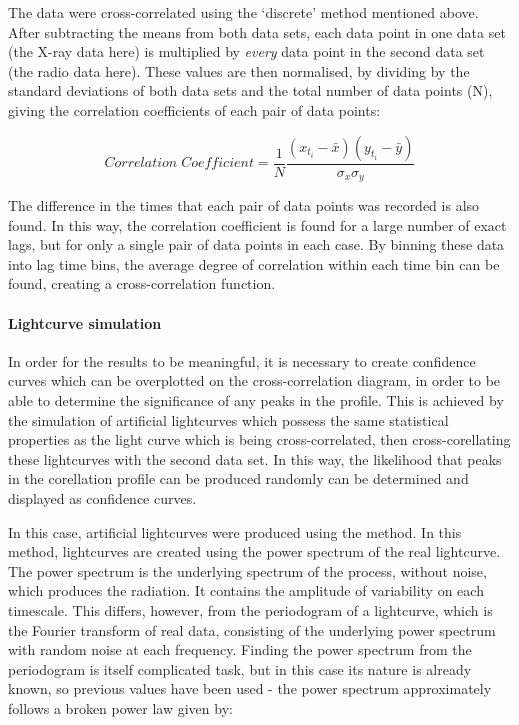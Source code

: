 \documentclass[letters,useAMS,usenatbib]{samnote}
\begin{document}
The data were cross-correlated using the `discrete' method mentioned above. After subtracting the means from both data sets, each data point in one data set (the X-ray
data here) is multiplied by {\it every} data point in the second data set (the radio data here). These values are then normalised, by dividing by the standard deviations
of both data sets and the total number of data points (N), giving the correlation coefficients of each pair of data points:

\begin{equation}
Correlation\;Coefficient = \frac{1}{N} \frac{(x_{t_i} - \bar{x}) (y_{t_i} - \bar{y})}{\sigma_x \sigma_y} 
\end{equation}

The difference in the times that each pair of data points was recorded is also found. In this way, the correlation coefficient is found for a large number of exact lags,
but for only a single pair of data points in each case. By binning these data into lag time bins, the average degree of correlation within each time bin can be found,
creating a cross-correlation function. 


\paragraph{Lightcurve simulation}

In order for the results to be meaningful, it is necessary to create confidence curves which can be overplotted on the cross-correlation diagram, in order to be able to
determine the significance of any peaks in the profile. This is achieved by the simulation of artificial lightcurves which possess the same statistical properties as
the light curve which is being cross-correlated, then cross-corellating these lightcurves with the second data set. In this way, the likelihood that peaks in the
corellation profile can be produced randomly can be determined and displayed as confidence curves.

In this case, artificial lightcurves were produced using the \citet{timmer&koenig} method. In this method, lightcurves are created using the power spectrum of the
real lightcurve. The power spectrum is the underlying spectrum of the process, without noise, which produces the radiation. It contains the amplitude of variability on
each timescale. This differs, however, from the periodogram of a lightcurve, which is the Fourier transform of real data, consisting of the underlying power spectrum with
random noise at each frequency. Finding the power spectrum from the periodogram is itself complicated task, but in this case its nature is already known, so previous
values have been used - the power spectrum approximately follows a broken power law given by: 
\end{document}
